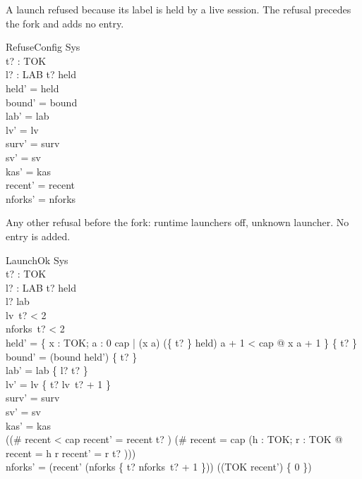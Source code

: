 \documentclass[a4paper,10pt,fleqn]{article}
\begin{document}
A launch refused because its label is held by a live session. The refusal precedes the fork and adds no entry.

\begin{schema}{RefuseConfig}
  \Delta Sys \\
  t? : TOK \\ l? : LAB
\where
  t? \notin \dom held \\
  held' = held \\
  bound' = bound \\
  lab' = lab \\
  lv' = lv \\
  surv' = surv \\
  sv' = sv \\
  kas' = kas \\
  recent' = recent \\
  nforks' = nforks
\end{schema}

Any other refusal before the fork: runtime launchers off, unknown launcher. No entry is added.

\begin{schema}{LaunchOk}
  \Delta Sys \\
  t? : TOK \\ l? : LAB
\where
  t? \notin \dom held \\
  l? \notin \dom lab \\
  lv~t? < 2 \\
  nforks~t? < 2 \\
  held' = \{ x : TOK; a : 0 \upto cap | (x \mapsto a) \in (\{ t? \} \ndres held) \land a + 1 < cap @ x \mapsto a + 1 \} \cup \{ t?  \} \\
  bound' = (bound \cap \dom held') \cup \{ t? \} \\
  lab' = lab \cup \{ l? \mapsto t? \} \\
  lv' = lv \oplus \{ t? \mapsto lv~t? + 1 \} \\
  surv' = surv \\
  sv' = sv \\
  kas' = kas \\
  ((\# recent < cap \land recent' = recent \cat \langle t? \rangle) \lor (\# recent = cap \land (\exists h : TOK; r : \seq TOK @ recent = \langle h \rangle \cat r \land recent' = r \cat \langle t? \rangle))) \\
  nforks' = (\ran recent' \dres (nforks \oplus \{ t? \mapsto nforks~t? + 1 \})) \cup ((TOK \setminus \ran recent') \cross \{ 0 \})
\end{schema}
\end{document}
